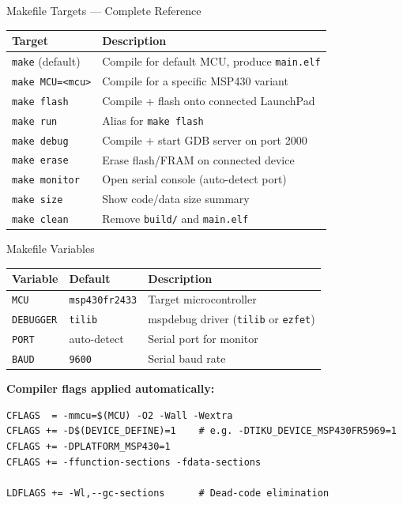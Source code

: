 \documentclass[aspectratio=169, 10pt]{beamer}
\begin{document}
\begin{frame}[fragile]{Makefile Targets — Complete Reference}
\begin{table}
\centering
\small
\begin{tabular}{@{}lp{7.5cm}@{}}
\toprule
\textbf{Target} & \textbf{Description} \\
\midrule
\texttt{make} (default)              & Compile for default MCU, produce \texttt{main.elf} \\
\texttt{make MCU=<mcu>}              & Compile for a specific MSP430 variant \\
\texttt{make flash}                  & Compile + flash onto connected LaunchPad \\
\texttt{make run}                    & Alias for \texttt{make flash} \\
\texttt{make debug}                  & Compile + start GDB server on port 2000 \\
\texttt{make erase}                  & Erase flash/FRAM on connected device \\
\texttt{make monitor}                & Open serial console (auto-detect port) \\
\texttt{make size}                   & Show code/data size summary \\
\texttt{make clean}                  & Remove \texttt{build/} and \texttt{main.elf} \\
\bottomrule
\end{tabular}
\end{table}
\end{frame}

\begin{frame}[fragile]{Makefile Variables}
\begin{table}
\centering
\small
\begin{tabular}{@{}llp{5.5cm}@{}}
\toprule
\textbf{Variable} & \textbf{Default} & \textbf{Description} \\
\midrule
\texttt{MCU}       & \texttt{msp430fr2433} & Target microcontroller \\
\texttt{DEBUGGER}  & \texttt{tilib}        & mspdebug driver (\texttt{tilib} or \texttt{ezfet}) \\
\texttt{PORT}      & auto-detect           & Serial port for monitor \\
\texttt{BAUD}      & \texttt{9600}         & Serial baud rate \\
\bottomrule
\end{tabular}
\end{table}

\vspace{0.3em}
\textbf{Compiler flags applied automatically:}
\begin{lstlisting}[style=makestyle]
CFLAGS  = -mmcu=$(MCU) -O2 -Wall -Wextra
CFLAGS += -D$(DEVICE_DEFINE)=1    # e.g. -DTIKU_DEVICE_MSP430FR5969=1
CFLAGS += -DPLATFORM_MSP430=1
CFLAGS += -ffunction-sections -fdata-sections

LDFLAGS += -Wl,--gc-sections      # Dead-code elimination
\end{lstlisting}
\end{frame}
\end{document}
